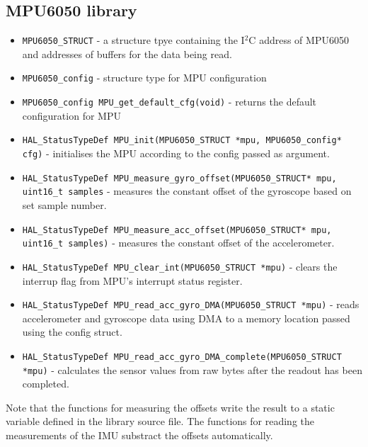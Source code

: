 \subsection{MPU6050 library}
    \begin{itemize}
        \item \texttt{MPU6050\_STRUCT} - a structure tpye containing the I$^2$C address of MPU6050 and addresses of buffers for the data being read.
        \item \texttt{MPU6050\_config} - structure type for MPU configuration
        \item \texttt{MPU6050\_config MPU\_get\_default\_cfg(void)} - returns the default configuration for MPU
        \item \texttt{HAL\_StatusTypeDef MPU\_init(MPU6050\_STRUCT *mpu, MPU6050\_config* cfg)} - initialises the MPU according to the config passed as argument. 
        \item \texttt{HAL\_StatusTypeDef MPU\_measure\_gyro\_offset(MPU6050\_STRUCT* mpu, uint16\_t samples} - measures the constant offset of the gyroscope based on set sample number.
        \item \texttt{HAL\_StatusTypeDef MPU\_measure\_acc\_offset(MPU6050\_STRUCT* mpu, uint16\_t samples)} - measures the constant offset of the accelerometer.
        \item \texttt{HAL\_StatusTypeDef MPU\_clear\_int(MPU6050\_STRUCT *mpu)} - clears the interrup flag from MPU's interrupt status register.
        \item \texttt{HAL\_StatusTypeDef MPU\_read\_acc\_gyro\_DMA(MPU6050\_STRUCT *mpu)} - reads accelerometer and gyroscope data using DMA to a memory location passed using the config struct.
        \item \texttt{HAL\_StatusTypeDef MPU\_read\_acc\_gyro\_DMA\_complete(MPU6050\_STRUCT *mpu)} - calculates the sensor values from raw bytes after the readout has been completed.
    \end{itemize}

    Note that the functions for measuring the offsets write the result to a static variable defined in the library source file. The functions for reading the measurements of the IMU substract the offsets automatically.